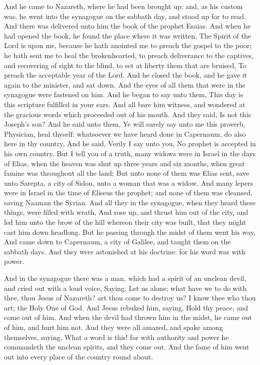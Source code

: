  And he came to Nazareth, where he had been brought up:
and, as his custom was, he went into the synagogue on the sabbath day,
and stood up for to read.  And there was delivered unto him
the book of the prophet Esaias. And when he had opened the book, he
found the place where it was written,  The Spirit of the
Lord is upon me, because he hath anointed me to preach the gospel to the
poor; he hath sent me to heal the brokenhearted, to preach deliverance
to the captives, and recovering of sight to the blind, to set at liberty
them that are bruised,  To preach the acceptable year of
the Lord.  And he closed the book, and he gave it again to
the minister, and sat down. And the eyes of all them that were in the
synagogue were fastened on him.  And he began to say unto
them, This day is this scripture fulfilled in your ears. 
And all bare him witness, and wondered at the gracious words which
proceeded out of his mouth. And they said, Is not this Joseph's son?
 And he said unto them, Ye will surely say unto me this
proverb, Physician, heal thyself: whatsoever we have heard done in
Capernaum, do also here in thy country.  And he said,
Verily I say unto you, No prophet is accepted in his own country.
 But I tell you of a truth, many widows were in Israel in
the days of Elias, when the heaven was shut up three years and six
months, when great famine was throughout all the land;  But
unto none of them was Elias sent, save unto Sarepta, a city of Sidon,
unto a woman that was a widow.  And many lepers were in
Israel in the time of Eliseus the prophet; and none of them was
cleansed, saving Naaman the Syrian.  And all they in the
synagogue, when they heard these things, were filled with wrath,
 And rose up, and thrust him out of the city, and led him
unto the brow of the hill whereon their city was built, that they might
cast him down headlong.  But he passing through the midst
of them went his way,  And came down to Capernaum, a city
of Galilee, and taught them on the sabbath days.  And they
were astonished at his doctrine: for his word was with power.

 And in the synagogue there was a man, which had a spirit
of an unclean devil, and cried out with a loud voice, 
Saying, Let us alone; what have we to do with thee, thou Jesus of
Nazareth? art thou come to destroy us? I know thee who thou art; the
Holy One of God.  And Jesus rebuked him, saying, Hold thy
peace, and come out of him. And when the devil had thrown him in the
midst, he came out of him, and hurt him not.  And they were
all amazed, and spake among themselves, saying, What a word is this! for
with authority and power he commandeth the unclean spirits, and they
come out.  And the fame of him went out into every place of
the country round about.

